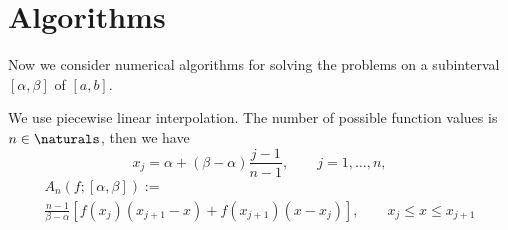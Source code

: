 \documentclass[]{elsarticle}
\DeclareMathOperator{\err}{err}
\theoremstyle{definition}
\theoremstyle{remark}
\newcommand{\Hnorm}[1]{\norm[\ch]{#1}}
\begin{document}
%
%


\section{Algorithms}
Now we consider numerical algorithms for solving the problems on a subinterval $[\alpha, \beta]$ of $[a, b]$.

We use piecewise linear interpolation. The number of possible function values is $ n \in \naturals$, then we have
\begin{equation}
x_j= \alpha + (\beta-\alpha) \frac{j-1}{n-1}, \qquad j=1, \ldots, n,
\end{equation}
\begin{multline}
A_n(f;[\alpha,\beta]):=\\
\frac{n-1}{\beta-\alpha}\left[f(x_j)(x_{j+1}-x)+f(x_{j+1})(x-x_j)\right], \qquad  x_{j}\le x \le x_{j+1}
\end{multline}
\end{document}
